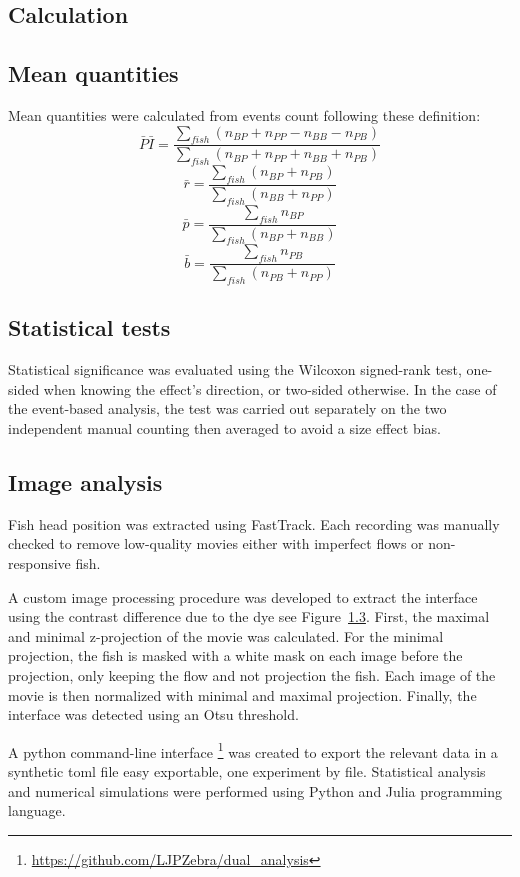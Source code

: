 \begin{appendices}
  \chapter{Calculation}
    \section{Mean quantities}
    Mean quantities were calculated from events count following these definition:
    $$
    \bar{P}\bar{I} = \frac{\sum_{fish}^{}(n_{BP} + n_{PP} - n_{BB} - n_{PB})}{\sum_{fish}^{}(n_{BP} + n_{PP} + n_{BB} + n_{PB})}
    $$
    $$
    \bar{r} =\frac{\sum_{fish}^{}(n_{BP} + n_{PB})}{\sum_{fish}^{}(n_{BB} + n_{PP})}
    $$
    $$
    \bar{p} = \frac{\sum_{fish}^{}n_{BP}}{\sum_{fish}^{}(n_{BP} + n_{BB})}
    $$
    $$
    \bar{b} = \frac{\sum_{fish}^{}n_{PB}}{\sum_{fish}^{}(n_{PB} + n_{PP})}
    $$

    \section{Statistical tests}
    Statistical significance was evaluated using the Wilcoxon signed-rank test, one-sided when knowing the effect's direction, or two-sided otherwise. In the case of the event-based analysis, the test was carried out separately on the two independent manual counting then averaged to avoid a size effect bias.

    \section{Image analysis}
    Fish head position was extracted using FastTrack. Each recording was manually checked to remove low-quality movies either with imperfect flows or non-responsive fish.

    A custom image processing procedure was developed to extract the interface using the contrast difference due to the dye see Figure~\ref{}. First, the maximal and minimal z-projection of the movie was calculated. For the minimal projection, the fish is masked with a white mask on each image before the projection, only keeping the flow and not projection the fish. Each image of the movie is then normalized with minimal and maximal projection. Finally, the interface was detected using an Otsu threshold.

    A python command-line interface \footnote{\url{https://github.com/LJPZebra/dual_analysis}} was created to export the relevant data in a synthetic toml file easy exportable, one experiment by file. Statistical analysis and numerical simulations were performed using Python and Julia programming language.


\end{appendices}
